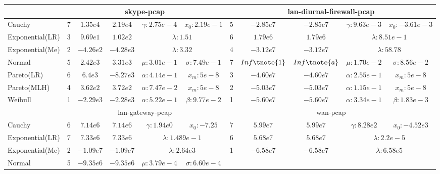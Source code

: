 \begin{table}[ht!]
{\begin{threeparttable}[t]
\begin{tabular}{lcccccccccc}
        & \multicolumn{5}{c}{skype-pcap}  & \multicolumn{5}{c}{lan-diurnal-firewall-pcap}   \\ \hline 
        Cauchy          &    7 & $1.35e4$    & $2.19e4$    & $\gamma:2.75e-4$ & $x_0:2.19e-1$    
        &    5 & $-2.85e7$   & $-2.85e7$   & $\gamma:9.63e-3$ & $x_0:-3.61e-3$    \\
        Exponential(LR) &    3 & $9.69e1$   & $1.02e2$   & \multicolumn{2}{c}{$\lambda:1.51$}   
        &    6 & $1.79e6$    & $1.79e6$    & \multicolumn{2}{c}{$\lambda:8.51e-1$}    \\
        Exponential(Me) &    2 & $-4.26e2$   & $-4.28e3$   & \multicolumn{2}{c}{$\lambda:3.32$}   
        &    4 & $-3.12e7$   & $-3.12e7$   & \multicolumn{2}{c}{$ \lambda:58.78$} \\
        Normal          &    5 & $2.42e3$    & $3.31e3$    & $\mu:3.01e-1 $    & $\sigma:7.49e-1$ 
        &    7 & $Inf \tnote{1}$       & $Inf \tnote{a}$       & $\mu:1.70e-2$     & $\sigma:8.56e-2$ \\
        Pareto(LR)      &    6 & $6.4e3$   & $-8.27e3$   & $\alpha:4.14e-1$ & $x_m:5e-8$    
        &    3 & $-4.60e7$   & $-4.60e7$   & $\alpha:2.55e-1$ & $ x_m:5e-8$    \\
        Pareto(MLH)     &    4 & $3.62e2$   & $3.72e2$   & $\alpha:7.47e-2$ & $x_m:5e-8$    
        &    2 & $-5.03e7$   & $-5.03e7$   & $\alpha:1.15e-1$ & $ x_m:5e-8$    \\
        Weibull         &    1 & $-2.29e3$   & $-2.28e3$  & $\alpha:5.22e-1$ & $\beta:9.77e-2$  
        &    1 & $-5.60e7$   & $-5.60e7$   & $\alpha:3.34e-1$ & $\beta:1.83e-3$  \\ \hline    
        & \multicolumn{5}{c}{lan-gateway-pcap} & \multicolumn{5}{c}{wan-pcap}  \\ \hline
        Cauchy          &    6 & $7.14e6$    & $7.14e6$   & $\gamma:1.94e0$ &$x_0:-7.25$    
        &    7 & $5.99e7$    & $5.99e7$   & $ \gamma:8.28e2$ &$x_0:-4.52e3$    \\
        Exponential(LR) &    7 & $7.33e6$    & $7.33e6$   & \multicolumn{2}{c}{$\lambda:1.489e-1$}   
        &    6 & $5.68e7$    & $ 5.68e7$  & \multicolumn{2}{c}{$\lambda:2.2e-5$}   \\
        Exponential(Me) &    2 & $-1.09e7$   & $-1.09e7$  & \multicolumn{2}{c}{$\lambda:2.64e3$}   
        &    1 & $-6.58e7$   & $-6.58e7$  & \multicolumn{2}{c}{$\lambda:6.58e5$} \\
        Normal          &    5 & $-9.35e6$   & $-9.35e6$  & $\mu:3.79e-4$   &$\sigma:6.60e-4$ 

\end{tabular}
\end{threeparttable}}
\end{table}

